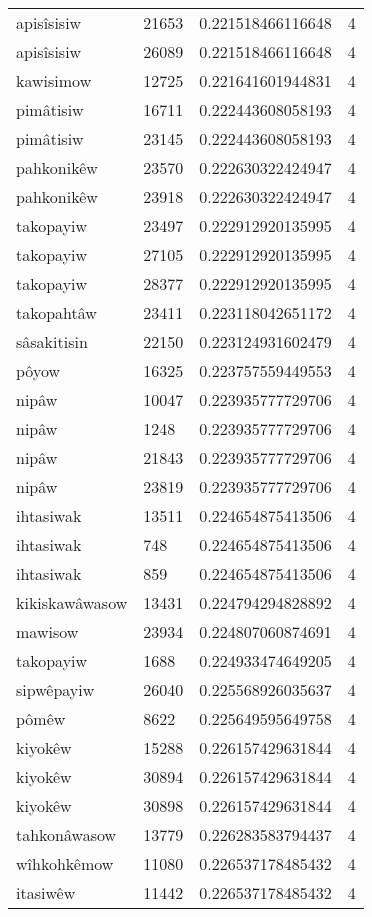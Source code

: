 \begin{longtable}{llll}
apisîsisiw & 21653 & 0.221518466116648 & 4 \\
apisîsisiw & 26089 & 0.221518466116648 & 4 \\
kawisimow & 12725 & 0.221641601944831 & 4 \\
pimâtisiw & 16711 & 0.222443608058193 & 4 \\
pimâtisiw & 23145 & 0.222443608058193 & 4 \\
pahkonikêw & 23570 & 0.222630322424947 & 4 \\
pahkonikêw & 23918 & 0.222630322424947 & 4 \\
takopayiw & 23497 & 0.222912920135995 & 4 \\
takopayiw & 27105 & 0.222912920135995 & 4 \\
takopayiw & 28377 & 0.222912920135995 & 4 \\
takopahtâw & 23411 & 0.223118042651172 & 4 \\
sâsakitisin & 22150 & 0.223124931602479 & 4 \\
pôyow & 16325 & 0.223757559449553 & 4 \\
nipâw & 10047 & 0.223935777729706 & 4 \\
nipâw & 1248 & 0.223935777729706 & 4 \\
nipâw & 21843 & 0.223935777729706 & 4 \\
nipâw & 23819 & 0.223935777729706 & 4 \\
ihtasiwak & 13511 & 0.224654875413506 & 4 \\
ihtasiwak & 748 & 0.224654875413506 & 4 \\
ihtasiwak & 859 & 0.224654875413506 & 4 \\
kikiskawâwasow & 13431 & 0.224794294828892 & 4 \\
mawisow & 23934 & 0.224807060874691 & 4 \\
takopayiw & 1688 & 0.224933474649205 & 4 \\
sipwêpayiw & 26040 & 0.225568926035637 & 4 \\
pômêw & 8622 & 0.225649595649758 & 4 \\
kiyokêw & 15288 & 0.226157429631844 & 4 \\
kiyokêw & 30894 & 0.226157429631844 & 4 \\
kiyokêw & 30898 & 0.226157429631844 & 4 \\
tahkonâwasow & 13779 & 0.226283583794437 & 4 \\
wîhkohkêmow & 11080 & 0.226537178485432 & 4 \\
itasiwêw & 11442 & 0.226537178485432 & 4 \\

\end{longtable}
